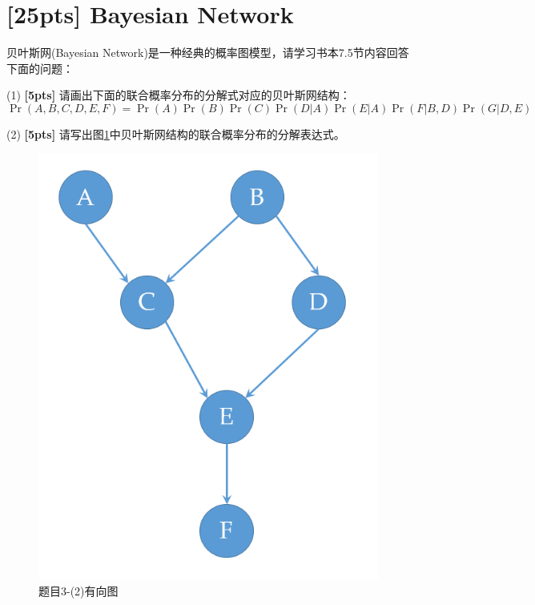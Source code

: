 \documentclass[a4paper,UTF8]{article}
\numberwithin{equation}{section}
\theoremstyle{definition}
\begin{document}
\section{\textbf{[25pts]} Bayesian Network}
贝叶斯网(Bayesian Network)是一种经典的概率图模型，请学习书本7.5节内容回答下面的问题：

(1) \textbf{[5pts]} 请画出下面的联合概率分布的分解式对应的贝叶斯网结构：
\begin{equation*}
\Pr(A, B, C, D, E, F) = \Pr(A)\Pr(B)\Pr(C)\Pr(D|A)\Pr(E|A)\Pr(F|B, D)\Pr(G|D, E)
\end{equation*}

(2) \textbf{[5pts]} 请写出图\ref{fig-DAG}中贝叶斯网结构的联合概率分布的分解表达式。
\begin{figure}[h]
\label{fig-DAG}
\centering
\includegraphics[scale=0.3]{bayes_net.png}
\caption{题目3-(2)有向图}
\end{figure}
\end{document}
